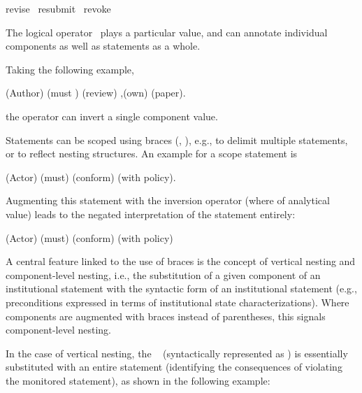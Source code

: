 \vspace{0.2cm}
\begin{exa}\I{}\lp revise \OR{}~resubmit \OR{}~revoke\rp\end{exa}
\vspace{0.2cm}

The logical operator \NOT{}~plays a particular value, and can annotate individual components as well as statements as a whole.

Taking the following example, 

\begin{exa}
\A{}(Author) \D{}(must \NOT{}) \I{}(review) \Bdir{},\prop{}(own) \Bdir{}(paper).
\end{exa}

the operator can invert a single component value. 

\vspace{0.2cm}

Statements can be scoped using braces (\lb, \rb), e.g., to delimit multiple statements, or to reflect nesting structures. An example for a scope statement is 

\vspace{0.2cm}
\begin{exa}
\lb\A{}(Actor) \D{}(must) \I{}(conform) \Bdir{}(with policy).\rb
\end{exa}
\vspace{0.2cm}

Augmenting this statement with the inversion operator (where of analytical value) leads to the negated interpretation of the statement entirely:

\vspace{0.2cm}
\begin{exa}
\lb\A{}(Actor) \D{}(must) \I{}(conform) \Bdir{}(with policy)  \NOT{}\rb
\end{exa}
\vspace{0.2cm}

A central feature linked to the use of braces is the concept of vertical nesting and component-level nesting, i.e., the substitution of a given component of an institutional statement with the syntactic form of an institutional statement (e.g., preconditions expressed in terms of institutional state characterizations). Where components are augmented with braces instead of parentheses, this signals component-level nesting. 

In the case of vertical nesting, the \ORELSE~ (syntactically represented as \Oe{}) is essentially substituted with an entire statement (identifying the consequences of violating the monitored statement), as shown in the following example:

